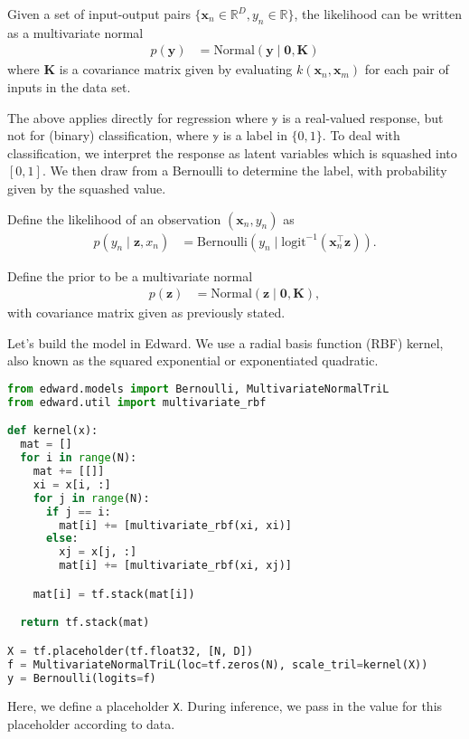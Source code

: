 Given a set of input-output pairs
$\{\mathbf{x}_n\in\mathbb{R}^D,y_n\in\mathbb{R}\}$,
the likelihood can be written as a multivariate normal
\begin{align*}
  p(\mathbf{y})
  &=
  \text{Normal}(\mathbf{y} \mid \mathbf{0}, \mathbf{K})
\end{align*}
where $\mathbf{K}$ is a covariance matrix given by evaluating
$k(\mathbf{x}_n, \mathbf{x}_m)$ for each pair of inputs in the data
set.

The above applies directly for regression where $\mathbb{y}$ is a
real-valued response, but not for (binary) classification, where $\mathbb{y}$
is a label in $\{0,1\}$. To deal with classification, we interpret the
response as latent variables which is squashed into $[0,1]$. We then
draw from a Bernoulli to determine the label, with probability given
by the squashed value.

Define the likelihood of an observation $(\mathbf{x}_n, y_n)$ as
\begin{align*}
  p(y_n \mid \mathbf{z}, x_n)
  &=
  \text{Bernoulli}(y_n \mid \text{logit}^{-1}(\mathbf{x}_n^\top \mathbf{z})).
\end{align*}

Define the prior to be a multivariate normal
\begin{align*}
  p(\mathbf{z})
  &=
  \text{Normal}(\mathbf{z} \mid \mathbf{0}, \mathbf{K}),
\end{align*}
with covariance matrix given as previously stated.

Let's build the model in Edward. We use a radial basis function (RBF)
kernel, also known as the squared exponential or exponentiated
quadratic.
\begin{lstlisting}[language=Python]
from edward.models import Bernoulli, MultivariateNormalTriL
from edward.util import multivariate_rbf

def kernel(x):
  mat = []
  for i in range(N):
    mat += [[]]
    xi = x[i, :]
    for j in range(N):
      if j == i:
        mat[i] += [multivariate_rbf(xi, xi)]
      else:
        xj = x[j, :]
        mat[i] += [multivariate_rbf(xi, xj)]

    mat[i] = tf.stack(mat[i])

  return tf.stack(mat)

X = tf.placeholder(tf.float32, [N, D])
f = MultivariateNormalTriL(loc=tf.zeros(N), scale_tril=kernel(X))
y = Bernoulli(logits=f)
\end{lstlisting}
Here, we define a placeholder \texttt{X}. During inference, we pass in
the value for this placeholder according to data.

